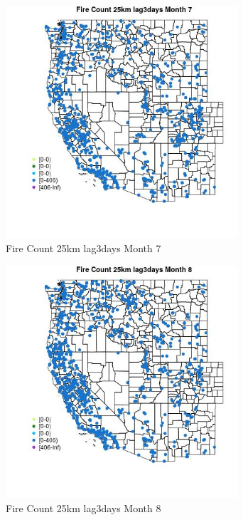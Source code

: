 \begin{figure} 
\centering  
\includegraphics[width=0.77\textwidth]{Code_Outputs/Report_ML_input_PM25_Step4_part_f_de_duplicated_aves_prioritize_24hr_obswNAs_MapObsMo7Fire_Count_25km_lag3days.jpg} 
\caption{\label{fig:Report_ML_input_PM25_Step4_part_f_de_duplicated_aves_prioritize_24hr_obswNAsMapObsMo7Fire_Count_25km_lag3days}Fire Count 25km lag3days Month 7} 
\end{figure} 
 

\begin{figure} 
\centering  
\includegraphics[width=0.77\textwidth]{Code_Outputs/Report_ML_input_PM25_Step4_part_f_de_duplicated_aves_prioritize_24hr_obswNAs_MapObsMo8Fire_Count_25km_lag3days.jpg} 
\caption{\label{fig:Report_ML_input_PM25_Step4_part_f_de_duplicated_aves_prioritize_24hr_obswNAsMapObsMo8Fire_Count_25km_lag3days}Fire Count 25km lag3days Month 8} 
\end{figure} 
 

